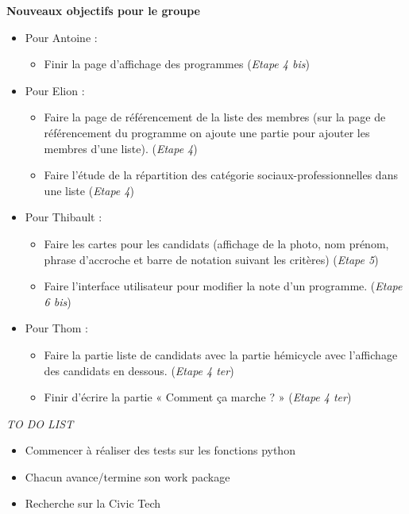 \vskip 0.25cm

\noindent
\textbf{Nouveaux objectifs pour le groupe}
\begin{itemize}
    \item Pour Antoine :
\begin{itemize}
    \item Finir la page d'affichage des programmes (\textit{Etape 4 bis})
\end{itemize}
\end{itemize}
\begin{itemize}
    \item Pour Elion :
\begin{itemize}
    \item Faire la page de référencement de la liste des membres (sur la page de référencement du programme on ajoute une partie pour ajouter les membres d’une liste). (\textit{Etape 4})
    \item Faire l’étude de la répartition des catégorie sociaux-professionnelles dans une liste (\textit{Etape 4})
\end{itemize}
\end{itemize}
\begin{itemize}
    \item Pour Thibault :
\begin{itemize}
    \item Faire les cartes pour les candidats (affichage de la photo, nom prénom, phrase d’accroche et barre de notation suivant les critères) (\textit{Etape 5})
    \item Faire l’interface utilisateur pour modifier la note d’un programme. (\textit{Etape 6 bis})
\end{itemize}
\end{itemize}
\begin{itemize}
    \item Pour Thom :
\begin{itemize}
    \item Faire la partie liste de candidats avec la partie hémicycle avec l’affichage des candidats en dessous. (\textit{Etape 4 ter})
    \item Finir d’écrire la partie « Comment ça marche ? » (\textit{Etape 4 ter})
\end{itemize}
\end{itemize}

\vskip 1cm
\noindent
\textit{TO DO LIST}
\vskip 0.25cm

\begin{itemize}
    \item Commencer à réaliser des tests sur les fonctions python 
    \item Chacun avance/termine son work package
    \item Recherche sur la Civic Tech
\end{itemize}